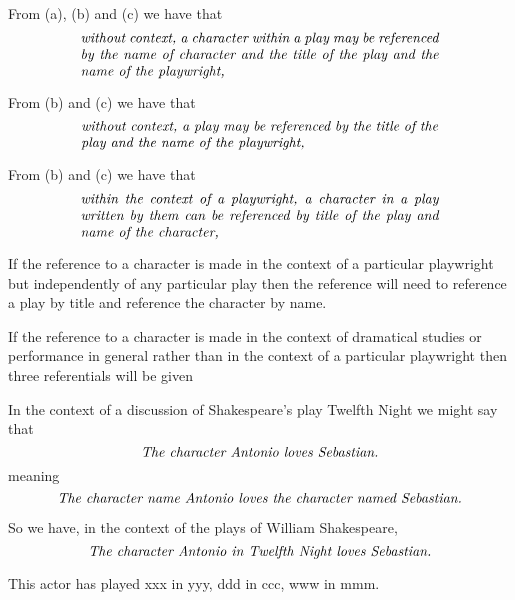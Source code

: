 \mynote 
From (a), (b) and (c) we have that
\begin{equation}
\text{\parbox{9cm}{\textit{without context, a character within a play 
may be referenced by the name of character and the title of the play and the name of the playwright,}}} 
\label{absoluteCharacterReferencing}
\end{equation}


From (b) and  (c) we have that
\begin{equation}
\text{\parbox{9cm}{\textit{without context, a play 
may be referenced by the title of the play and the name of the playwright,}}} 
\label{absolutePlayReferencing}
\end{equation}

From (b) and  (c) we have that
\begin{equation}
\text{\parbox{9cm}{\textit{within the context of a playwright, a character in a play written by them can be referenced by title of the play and name of the character,}}}
\label{playwrightRelativeCharacterReferencing}
\end{equation}

\mynote 
If the reference to a character is made in the context of a particular playwright but independently of any particular play then the reference will need to reference a play by title and reference the character by name. 

If the reference to a character is made in the context of dramatical studies or performance in general rather than in the context of a particular playwright then three referentials will be given 


In the context of a discussion of Shakespeare's play Twelfth Night we might say that
\begin{equation}
\label{AntonioLovesSebastian}
\mbox{\textit{The character Antonio loves Sebastian.}}
\end{equation} 
meaning
\begin{equation}
\label{AntonioLovesSebastianPedantic}
\mbox{\textit{The character name Antonio loves the character named Sebastian.}}
\end{equation} 

\mynote 
So we have, in the context of the plays of William Shakespeare,
\begin{equation}
\label{AntonioLovesSebastian}
\mbox{\textit{The character Antonio in Twelfth Night loves Sebastian.}}
\end{equation} 

This actor has played xxx in yyy, ddd in ccc, www in mmm.

